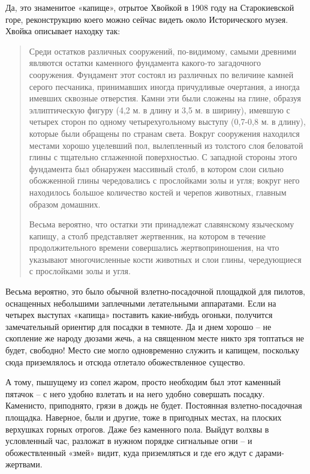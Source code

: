 Да, это знаменитое «капище», отрытое Хвойкой в 1908 году на Старокиевской горе, реконструкцию коего можно сейчас видеть около Исторического музея. Хвойка описывает находку так\cite{hvoyka02}:

\begin{quotation}
Среди остатков различных сооружений, по-видимому, самыми древними являются остатки каменного фундамента какого-то загадочного сооружения. Фундамент этот состоял из различных по величине камней серого песчаника, принимавших иногда причудливые очертания, а иногда имевших сквозные отверстия. Камни эти были сложены на глине, образуя эллиптическую фигуру (4,2 м. в длину и 3,5 м. в ширину), имевшую с четырех сторон по одному четырехугольному выступу (0,7-0,8 м. в длину), которые были обращены по странам света. Вокруг сооружения находился местами хорошо уцелевший пол, вылепленный из толстого слоя беловатой глины с тщательно сглаженной поверхностью. С западной стороны этого фундамента был обнаружен массивный столб, в котором слои сильно обожженной глины чередовались с прослойками золы и угля; вокруг него находилось большое количество костей и черепов животных, главным образом домашних.

Весьма вероятно, что остатки эти принадлежат славянскому языческому капищу, а столб представляет жертвенник, на котором в течение продолжительного времени совершались жертвоприношения, на что указывают многочисленные кости животных и слои глины, чередующиеся с прослойками золы и угля. 
\end{quotation}

Весьма вероятно, это было обычной взлетно-посадоч\-ной площадкой для пилотов, оснащенных небольшими заплечными летательными аппаратами. Если на четырех выступах «капища» поставить какие-нибудь огоньки, получится замечательный ориентир для посадки в темноте. Да и днем хорошо – не скопление же народу дюзами жечь, а на священном месте никто зря топтаться не будет, свободно! Место сие могло одновременно служить и капищем, поскольку сюда приземлялось и отсюда отлетало обожествленное существо.

А тому, пышущему из сопел жаром, просто необходим был этот каменный пятачок – с него удобно взлетать и на него удобно совершать посадку. Каменисто, приподнято, грязи в дождь не будет. Постоянная взлетно-посадочная площадка. Наверное, были и другие, тоже в пригодных местах, на плоских верхушках горных отрогов. Даже без каменного пола. Выйдут волхвы в условленный час, разложат в нужном порядке сигнальные огни – и обожествленный «змей» видит, куда приземляться и где его ждут с дарами-жертвами.

